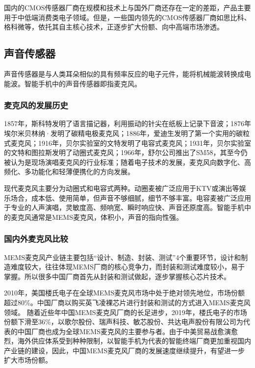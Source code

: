 \documentclass[a4paper,11pt,onecolumn,twoside]{article}
\begin{document}
\begin{multicols}{2}
国内的CMOS传感器厂商在规模和技术上与国外厂商还存在一定的差距，产品主要用于中低端消费类电子领域。但是，一些国内领先的CMOS传感器厂商如思比科、格科微等，依托其自主核心技术，正逐步扩大份额、向中高端市场渗透。

\subsection{声音传感器}

声音传感器是与人类耳朵相似的具有频率反应的电子元件，能将机械能波转换成电能波。智能手机中的声音传感器即指麦克风。

\subsubsection{麦克风的发展历史}

1857年，斯科特发明了语言描记器，利用振动的针尖在纸板上记录下音波；1876年埃尔米贝林纳·发明了碳精电极麦克风；1886年，爱迪生发明了第一个实用的碳粒式麦克风；1916年，贝尔实验室的文特发明了电容式麦克风；1931年，贝尔实验室的文特和图拉斯发明了动圈式麦克风；1966年，舒尔公司推出了SM58，其至今仍被认为是现场演唱麦克风的行业标准；随着电子技术的发展，麦克风向数字化、高频化、多功能化和轻薄便携化的方向发展。

现代麦克风主要分为动圈式和电容式两种。动圈麦被广泛应用于KTV或演出等娱乐场合，成本低、使用简单，但声音不够细腻，细节不够丰富。电容麦被广泛应用于专业的人声演唱，灵敏度高、频响宽、瞬时响应快、声音还原度高。智能手机中的麦克风通常是MEMS麦克风，体积小，声音的指向性强。

\subsubsection{国内外麦克风比较}


MEMS麦克风产业链主要包括“设计、制造、封装、测试”4个重要环节，设计和制造难度较大，往往体现MEMS厂商的核心竞争力，而封装和测试难度较小，易于掌握。所以很多中国厂商首先从封装和测试做起，逐步掌握核心芯片技术。

2010年，美国楼氏电子在全球MEMS麦克风市场中处于绝对领先地位，市场份额超过80\%。中国厂商以购买英飞凌裸芯片进行封装和测试的方式进入MEMS麦克风领域。 随着近些年中国MEMS麦克风厂商的长足进步，2019年，楼氏电子的市场份额下滑至36\%，以歌尔股份、瑞声科技、敏芯股份、共达电声股份有限公司为代表的中国厂商也成为全球MEMS麦克风的主要参与者。由于中美贸易战愈演愈烈，海外供应体系受到种种限制，以智能手机为代表的智能终端厂商更加重视国内产业链的建设，因此，中国MEMS麦克风厂商的发展速度继续提升，有望进一步扩大市场份额。


\end{multicols}
\end{document}
